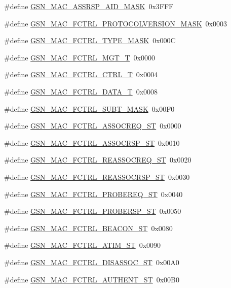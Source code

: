 \begin{DoxyCompactItemize}
\#define \hyperlink{a00523_a894338c879e33b667638a78f65e923a2}{GSN\_\-MAC\_\-ASSRSP\_\-AID\_\-MASK}~0x3FFF
\item 
\#define \hyperlink{a00523_a32b345e4167252b590258b256c497ed7}{GSN\_\-MAC\_\-FCTRL\_\-PROTOCOLVERSION\_\-MASK}~0x0003
\item 
\#define \hyperlink{a00523_acf97b27529a28ee5a6ba9884c8d9c474}{GSN\_\-MAC\_\-FCTRL\_\-TYPE\_\-MASK}~0x000C
\item 
\#define \hyperlink{a00523_af2c466a0167540196b435b458bc1e9ed}{GSN\_\-MAC\_\-FCTRL\_\-MGT\_\-T}~0x0000
\item 
\#define \hyperlink{a00523_a0c03d1bd8daffa50ebc27e1d3452b695}{GSN\_\-MAC\_\-FCTRL\_\-CTRL\_\-T}~0x0004
\item 
\#define \hyperlink{a00523_a922216036b4ed4b443f56027eecd428b}{GSN\_\-MAC\_\-FCTRL\_\-DATA\_\-T}~0x0008
\item 
\#define \hyperlink{a00523_ada6cd8fc7ec5a97a67240ea3670c7d82}{GSN\_\-MAC\_\-FCTRL\_\-SUBT\_\-MASK}~0x00F0
\item 
\#define \hyperlink{a00523_ae23c91e40c93812cab3c45ea083a05d1}{GSN\_\-MAC\_\-FCTRL\_\-ASSOCREQ\_\-ST}~0x0000
\item 
\#define \hyperlink{a00523_ac12ef43a52294a46ebdee5aa7ec8f2a1}{GSN\_\-MAC\_\-FCTRL\_\-ASSOCRSP\_\-ST}~0x0010
\item 
\#define \hyperlink{a00523_a70de5711418ecf23ece9583c3c467f5a}{GSN\_\-MAC\_\-FCTRL\_\-REASSOCREQ\_\-ST}~0x0020
\item 
\#define \hyperlink{a00523_aed2d11f1d977251b059eb9d85d8dc545}{GSN\_\-MAC\_\-FCTRL\_\-REASSOCRSP\_\-ST}~0x0030
\item 
\#define \hyperlink{a00523_a1fc57448007137a2bac22714c9f7ca77}{GSN\_\-MAC\_\-FCTRL\_\-PROBEREQ\_\-ST}~0x0040
\item 
\#define \hyperlink{a00523_a3fb1b989d878e7430e1b10bde689a86f}{GSN\_\-MAC\_\-FCTRL\_\-PROBERSP\_\-ST}~0x0050
\item 
\#define \hyperlink{a00523_a7128e7dee71ef2876860fb31a8575620}{GSN\_\-MAC\_\-FCTRL\_\-BEACON\_\-ST}~0x0080
\item 
\#define \hyperlink{a00523_a9b63f2806a249f4c43e8d32cfe6ee11e}{GSN\_\-MAC\_\-FCTRL\_\-ATIM\_\-ST}~0x0090
\item 
\#define \hyperlink{a00523_a245d69617b8e95402a80ad4d3cabb6f2}{GSN\_\-MAC\_\-FCTRL\_\-DISASSOC\_\-ST}~0x00A0
\item 
\#define \hyperlink{a00523_af71c2c5c82e67c9f5eb1ff72d732c11c}{GSN\_\-MAC\_\-FCTRL\_\-AUTHENT\_\-ST}~0x00B0
\item 

\end{DoxyCompactItemize}
